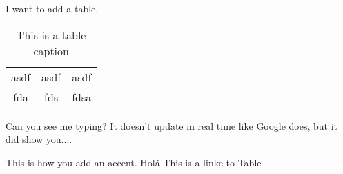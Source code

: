 
I want to add a table.
\begin{table} 
    \begin{tabular}{ c c c }
        asdf & asdf & asdf \\ 
        fda & fds & fdsa \\ 
    \end{tabular} 
    \caption{This is a table caption} 
\end{table}

Can you see me typing? It doesn't update in real time like Google does, but it did show you....

This is how you add an accent. Holá
This is a linke to Table
